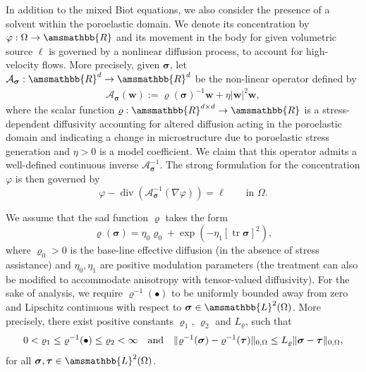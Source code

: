 \documentclass[fleqn,a4paper]{cas-sc}
\newcommand\qan{\quad\hbox{and}\quad}
\newcommand\vdiv{\mathop{\mathrm{div}}\nolimits}
\newcommand\tr{\mathop{\mathrm{tr}}\nolimits}
\newcommand{\bbR}{\amsmathbb{R}}
\newcommand\RR{\bbR}
\newcommand{\bn}{\boldsymbol{n}}
\newcommand{\bw}{\boldsymbol{w}}
\newcommand{\0}{\boldsymbol{0}}
\newcommand\cA{\mathcal{A}}
\newcommand\bbL{\amsmathbb{L}}
\newcommand\bsigma{\boldsymbol{\sigma}}
\newcommand\btau{\boldsymbol{\tau}}
\numberwithin{equation}{section}
\numberwithin{figure}{section}
\begin{document}
In addition to the mixed Biot equations, we also consider the presence of a solvent within the poroelastic domain. We denote its concentration by $\varphi:\Omega\to\bbR$ and its movement in the body for given volumetric source $\ell$ is governed by  {a} nonlinear diffusion process, to account for high-velocity flows.  More precisely, given $\bsigma$, let $\cA_{\bsigma}: \bbR^{d} \to \bbR^{d}$ be the non-linear operator defined by
\begin{align}\label{eq:nonlinear-A-difussion}
\cA_{\bsigma}(\bw):= \varrho(\bsigma)^{-1}\bw+\eta |\bw|^2\bw,
\end{align}
 where the scalar function  $\varrho:\RR^{d\times d} \rightarrow \RR$ is a stress-dependent diffusivity accounting for altered diffusion acting in the poroelastic domain and indicating a change in microstructure due to poroelastic stress generation and $\eta>0$ is a model coefficient. We claim that this operator admits a well-defined continuous inverse $\cA_{\bsigma}^{-1}$. The strong formulation for the concentration $\varphi$ is then governed by
\begin{equation}\label{eq:phi}
\varphi   
- \vdiv( \cA_{\bsigma}^{-1}(\nabla \varphi)) =  \ell \qquad \text{in $\Omega$}.
\end{equation}


We assume that the \gls{sad} function $\varrho$ takes the form
 \begin{equation}\label{eq:D}
\varrho(\bsigma) = \eta_0 \varrho_0 + \exp(-\eta_1[ \tr\bsigma]^2),
 \end{equation}
where $\varrho_0>0$ is the base-line effective diffusion (in the absence of stress assistance) and $\eta_0,\eta_1$ are positive modulation parameters (the treatment can also be modified to accommodate anisotropy with tensor-valued diffusivity). For 
the sake of analysis, we   require $\varrho^{-1}(\bullet)$ to be uniformly bounded away from zero and Lipschitz continuous with respect to $\bsigma \in \bbL^{2}(\Omega)$. More precisely, there exist positive constants $\varrho_{1}$, $\varrho_{2}$ and $L_{\varrho}$, such that 
\begin{align*}%
    0 < \varrho_{1} \leq \varrho^{-1}(\bullet) \leq \varrho_{2} < \infty \qan \|\varrho^{-1}(\bsigma)-\varrho^{-1}(\btau)\|_{0,\Omega} \leq L_{\varrho}\|\bsigma-\btau\|_{0,\Omega},
\end{align*}
for all $\bsigma,\btau \in \bbL^{2}(\Omega)$.
\end{document}
